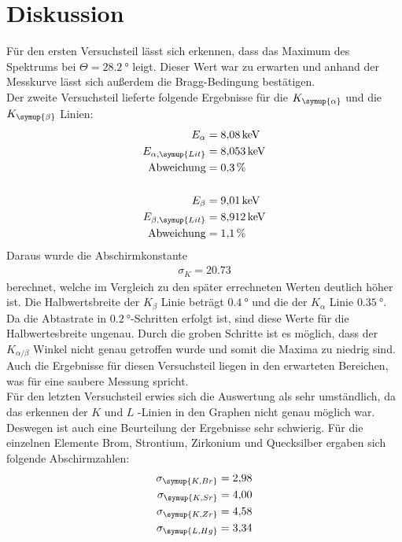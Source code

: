 \section{Diskussion}
\label{sec:Diskussion}

Für den ersten Versuchsteil lässt sich erkennen, dass das Maximum des Spektrums
bei $\Theta = \SI{28.2}{\degree}$ leigt. Dieser Wert war zu erwarten und anhand der
Messkurve lässt sich außerdem die Bragg-Bedingung bestätigen.\\
Der zweite Versuchsteil lieferte folgende Ergebnisse für die $K_\symup{\alpha}$ und
die $K_\symup{\beta}$ Linien:\\
\begin{align*}
  E_\alpha &= \SI{8.08}{\kilo\eV}\\
  E_{\alpha,\symup{Lit}} &= \SI{8.053}{\kilo\eV}\\
  \text{Abweichung} &= \SI{0.3}{\percent}\\\\
  E_\beta &= \SI{9.01}{\kilo\eV}\\
  E_{\beta,\symup{Lit}} &= \SI{8.912}{\kilo\eV}\\
  \text{Abweichung} &= \SI{1.1}{\percent}\\
\end{align*}
Daraus wurde die Abschirmkonstante
\begin{align*}
  \sigma_K = \num{20.73}
\end{align*}
berechnet, welche im Vergleich zu den später errechneten Werten deutlich höher ist. Die
Halbwertsbreite der $K_\beta$ Linie beträgt $\SI{0.4}{\degree}$ und die der
$K_\alpha$ Linie $\SI{0.35}{\degree}$. Da die Abtastrate in $\SI{0.2}{\degree}$-Schritten erfolgt
ist, sind diese Werte für die Halbwertesbreite ungenau. Durch die groben Schritte ist es möglich,
dass der
$K_{\alpha/\beta}$ Winkel nicht genau getroffen wurde und somit die Maxima zu niedrig sind.\\
Auch die Ergebnisse für diesen Versuchsteil liegen in den erwarteten Bereichen,
was für eine saubere Messung spricht.\\
Für den letzten Versuchsteil erwies sich die Auswertung als sehr umständlich, da
das erkennen der $K$ und $L$ -Linien in den Graphen nicht genau möglich war. Deswegen
ist auch eine Beurteilung der Ergebnisse sehr schwierig. Für die einzelnen
Elemente Brom, Strontium, Zirkonium und Quecksilber ergaben sich folgende
Abschirmzahlen:
\begin{align*}
  \sigma_\symup{K,Br} &= \num{2.98}\\
  \sigma_\symup{K,Sr} &= \num{4.00}\\
  \sigma_\symup{K,Zr} &= \num{4.58}\\
  \sigma_\symup{L,Hg} &= \num{3.34}\\
\end{align*}

\nocite{sample}
\nocite{alpha}
